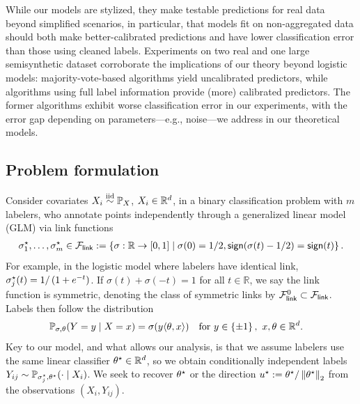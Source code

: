 While our models are stylized, they make testable predictions for real data
beyond simplified scenarios, in particular, that models fit on
non-aggregated data should both make better-calibrated predictions and have
lower classification error than those using cleaned labels.
%
Experiments on two real and one large semisynthetic dataset corroborate the
implications of our theory beyond logistic models: majority-vote-based
algorithms yield uncalibrated predictors, while algorithms using full label
information provide (more) calibrated predictors.
%
The former algorithms exhibit worse classification error in our experiments,
with the error gap depending on parameters---e.g.,
noise---we address in our theoretical models.
 

\subsection{Problem formulation}
\label{sec:formulation}


Consider covariates $X_i \stackrel{\textup{iid}}{\sim} \mathbb{P}_X$, $X_i \in \mathbb{R}^d$, in a
binary classification problem with $m$ labelers,
who annotate points independently through a generalized linear
model (GLM) via link functions %
\begin{align*}
  \sigma_1^\star, \dots,
  \sigma_m^\star \in \mathcal{F}_{\mathsf{link}} := \left\{{\sigma : \mathbb{R} \to [0, 1]
    \mid \sigma(0) = 1/2, \mathsf{sign}(\sigma(t) - 1/2) = \mathsf{sign}(t)}\right\}.
\end{align*} 
For example, in the logistic model where
labelers have identical link, $\sigma_j^\star(t) = 1 / \left({1 + e^{-t}}\right)$.
%
If $\sigma(t) + \sigma(-t) = 1$ for all $t \in \mathbb{R}$, we say the
link function is symmetric, denoting the class of symmetric
links by $\mathcal{F}_{\mathsf{link}}^0 \subset \mathcal{F}_{\mathsf{link}}$.
%
Labels then follow the distribution
\begin{align}
  \mathbb{P}_{\sigma, \theta}(Y = y \mid X = x) & =
  \sigma ( y \langle \theta, x\rangle) ~~~ \mbox{for~} y \in \left\{\pm 1\right\},
  ~ x,\theta \in \mathbb{R}^d. \label{eq:general-calibration-model}
\end{align}
Key to our model, and what allows our analysis, is that we assume
labelers use the same linear classifier $\theta^\star \in \mathbb{R}^d$, %
so we obtain conditionally independent labels $Y_{ij} \sim \mathbb{P}_{\sigma_j^\star,
  \theta^\star}(\cdot \mid X_i)$.
 We
seek to recover $\theta^\star$ or the direction $u^\star := \theta^\star /
\left\|{\theta^\star}\right\|_2$ from the observations $(X_i, Y_{ij})$.

